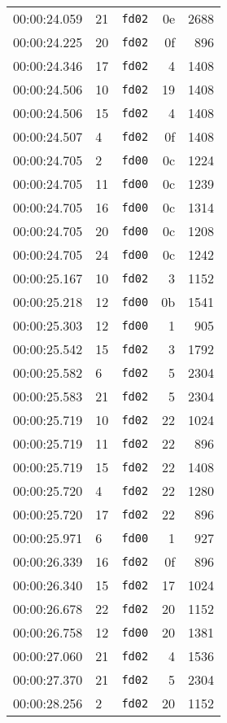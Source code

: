 \documentclass{article}
\begin{document}
\begin{longtable}{lllrr}
00:00:24.059 & 21 & \texttt{fd02} & 0e & 2688 \\
00:00:24.225 & 20 & \texttt{fd02} & 0f & 896 \\
00:00:24.346 & 17 & \texttt{fd02} & 4 & 1408 \\
00:00:24.506 & 10 & \texttt{fd02} & 19 & 1408 \\
00:00:24.506 & 15 & \texttt{fd02} & 4 & 1408 \\
00:00:24.507 & 4 & \texttt{fd02} & 0f & 1408 \\
00:00:24.705 & 2 & \texttt{fd00} & 0c & 1224 \\
00:00:24.705 & 11 & \texttt{fd00} & 0c & 1239 \\
00:00:24.705 & 16 & \texttt{fd00} & 0c & 1314 \\
00:00:24.705 & 20 & \texttt{fd00} & 0c & 1208 \\
00:00:24.705 & 24 & \texttt{fd00} & 0c & 1242 \\
00:00:25.167 & 10 & \texttt{fd02} & 3 & 1152 \\
00:00:25.218 & 12 & \texttt{fd00} & 0b & 1541 \\
00:00:25.303 & 12 & \texttt{fd00} & 1 & 905 \\
00:00:25.542 & 15 & \texttt{fd02} & 3 & 1792 \\
00:00:25.582 & 6 & \texttt{fd02} & 5 & 2304 \\
00:00:25.583 & 21 & \texttt{fd02} & 5 & 2304 \\
00:00:25.719 & 10 & \texttt{fd02} & 22 & 1024 \\
00:00:25.719 & 11 & \texttt{fd02} & 22 & 896 \\
00:00:25.719 & 15 & \texttt{fd02} & 22 & 1408 \\
00:00:25.720 & 4 & \texttt{fd02} & 22 & 1280 \\
00:00:25.720 & 17 & \texttt{fd02} & 22 & 896 \\
00:00:25.971 & 6 & \texttt{fd00} & 1 & 927 \\
00:00:26.339 & 16 & \texttt{fd02} & 0f & 896 \\
00:00:26.340 & 15 & \texttt{fd02} & 17 & 1024 \\
00:00:26.678 & 22 & \texttt{fd02} & 20 & 1152 \\
00:00:26.758 & 12 & \texttt{fd00} & 20 & 1381 \\
00:00:27.060 & 21 & \texttt{fd02} & 4 & 1536 \\
00:00:27.370 & 21 & \texttt{fd02} & 5 & 2304 \\
00:00:28.256 & 2 & \texttt{fd02} & 20 & 1152 \\

\end{longtable}
\end{document}
